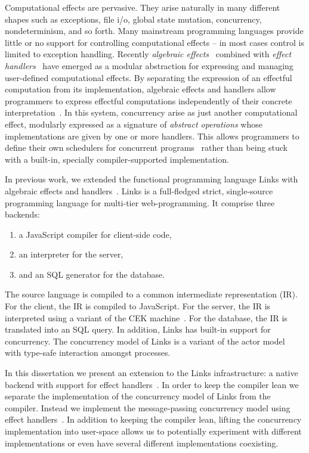 \documentclass[12pt,mscres,cdtppar,twoside,openright,logo,rightchapter,normalheadings]{infthesis}
\theoremstyle{definition}
\begin{document}
Computational effects are pervasive. They arise naturally in many
different shapes such as exceptions, file i/o, global state mutation,
concurrency, nondeterminism, and so forth. Many mainstream programming
languages provide little or no support for controlling computational
effects -- in most cases control is limited to exception
handling. Recently \emph{algebraic
  effects}~\citep{Plotkin2001,Plotkin2003} combined with \emph{effect
  handlers}~\citep{Plotkin2013} have emerged as a modular abstraction
for expressing and managing user-defined computational effects. By
separating the expression of an effectful computation from its
implementation, algebraic effects and handlers allow programmers to
express effectful computations independently of their concrete
interpretation~\citep{Kammar2013}. In this system, concurrency arise
as just another computational effect, modularly expressed as a
signature of \emph{abstract operations} whose implementations are
given by one or more handlers. This allows programmers to define their
own schedulers for concurrent programs~\citep{Dolan2015} rather than
being stuck with a built-in, specially compiler-supported
implementation.

In previous work, we extended the functional programming language
Links with algebraic effects and
handlers~\citep{Hillerstrom2015}. Links is a full-fledged strict,
single-source programming language for multi-tier web-programming. It
comprise three backends:
\begin{enumerate}
  \item a JavaScript compiler for client-side code,
  \item an interpreter for the server,
  \item and an SQL generator for the database.
\end{enumerate}
The source language is compiled to a common intermediate
representation (IR).  For the client, the IR is compiled to
JavaScript. For the server, the IR is interpreted using a variant of
the CEK machine~\citep{Felleisen1986,Hillerstrom2016a}. For the
database, the IR is translated into an SQL query.
%
In addition, Links has built-in support for concurrency. The
concurrency model of Links is a variant of the actor
model~\citep{Hewitt1977} with type-safe interaction amongst processes.

In this dissertation we present an extension to the Links
infrastructure: a native backend with support for effect
handlers~\citep{Hillerstrom2016b}. In order to keep the compiler lean
we separate the implementation of the concurrency model of Links from
the compiler. Instead we implement the message-passing concurrency
model using effect handlers~\citep{Hillerstrom2016c}. In addition to
keeping the compiler lean, lifting the concurrency implementation into
user-space allows us to potentially experiment with different
implementations or even have several different implementations
coexisting.
\end{document}

